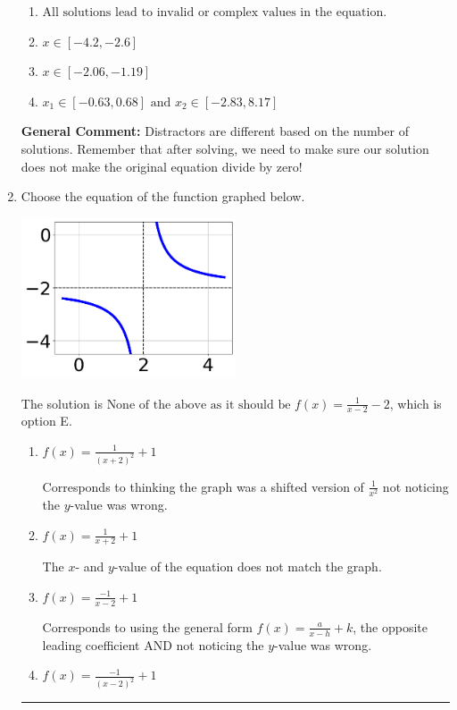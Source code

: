 \documentclass{extbook}[14pt]
\newcommand{\litem}[1]{\item #1

\rule{\textwidth}{0.4pt}}
\begin{document}
\begin{enumerate}
{\begin{enumerate}[label=\Alph*.]
* $x = 0.523 \text{ and } x = -3.123$, which is the correct option.
\item \( \text{All solutions lead to invalid or complex values in the equation.} \)


\item \( x \in [-4.2,-2.6] \)


\item \( x \in [-2.06,-1.19] \)


\item \( x_1 \in [-0.63, 0.68] \text{ and } x_2 \in [-2.83,8.17] \)


\end{enumerate}

\textbf{General Comment:} Distractors are different based on the number of solutions. Remember that after solving, we need to make sure our solution does not make the original equation divide by zero!
}
\litem{
Choose the equation of the function graphed below.

\begin{center}
    \includegraphics[width=0.5\textwidth]{../Figures/rationalGraphToEquationC.png}
\end{center}


The solution is \( \text{None of the above as it should be } f(x) = \frac{1}{x - 2} - 2 \), which is option E.\begin{enumerate}[label=\Alph*.]
\item \( f(x) = \frac{1}{(x + 2)^2} + 1 \)

Corresponds to thinking the graph was a shifted version of $\frac{1}{x^2}$ not noticing the $y$-value was wrong.
\item \( f(x) = \frac{1}{x + 2} + 1 \)

The $x$- and $y$-value of the equation does not match the graph.
\item \( f(x) = \frac{-1}{x - 2} + 1 \)

Corresponds to using the general form $f(x) = \frac{a}{x-h}+k$, the opposite leading coefficient AND not noticing the $y$-value was wrong.
\item \( f(x) = \frac{-1}{(x - 2)^2} + 1 \)


\end{enumerate}}
\end{enumerate}
\end{document}
